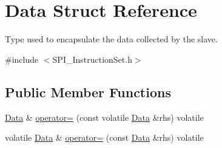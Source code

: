 \hypertarget{struct_data}{}\section{Data Struct Reference}
\label{struct_data}


Type used to encapsulate the data collected by the slave.  




{\ttfamily \#include $<$S\+P\+I\+\_\+\+Instruction\+Set.\+h$>$}

\subsection*{Public Member Functions}
\begin{DoxyCompactItemize}
\item 
\mbox{\hyperlink{struct_data}{Data}} \& \mbox{\hyperlink{struct_data_a3ae506c712bc36c15533f5499608a047}{operator=}} (const volatile \mbox{\hyperlink{struct_data}{Data}} \&rhs) volatile
\item 
volatile \mbox{\hyperlink{struct_data}{Data}} \& \mbox{\hyperlink{struct_data_a7c50ba562a0dcddc5ca2c733f1bbcb61}{operator=}} (const \mbox{\hyperlink{struct_data}{Data}} \&rhs) volatile
\end{DoxyCompactItemize}
